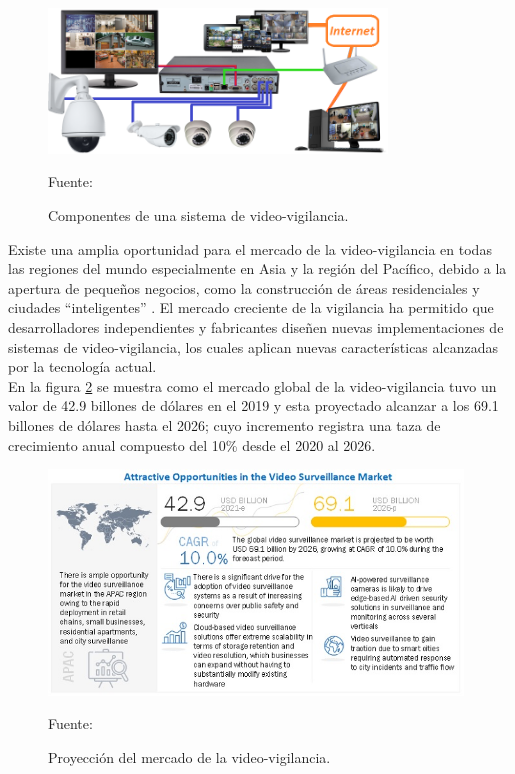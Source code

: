 \begin{figure}[H]
    \begin{center}
        \includegraphics[width=9cm]{img/capitulo_2/sis_videovigilancia.png}
        \caption{Componentes de una sistema de video-vigilancia.\\}
        Fuente: \cite{videosurvellance}
        \label{fig:sistema_video_vigilancia}
    \end{center}
    
\end{figure}

Existe una amplia oportunidad para el mercado de la video-vigilancia en todas las regiones del mundo especialmente en Asia y la región del Pacífico, debido a la apertura de pequeños negocios, como la construcción de áreas residenciales y ciudades ``inteligentes'' \cite{marketsandmarkets:market-surveillance}. El mercado creciente de la vigilancia ha permitido que desarrolladores independientes y fabricantes diseñen nuevas implementaciones de sistemas de video-vigilancia, los cuales aplican nuevas características alcanzadas por la tecnología actual.\\

En la figura \ref{fig:surveillance-market} se muestra como el mercado global de la video-vigilancia tuvo un valor de 42.9 billones de dólares en el 2019 y esta proyectado alcanzar a los 69.1 billones de dólares hasta el 2026; cuyo incremento registra una taza de crecimiento anual compuesto del 10\% desde el 2020 al 2026. \cite{marketsandmarkets:market-surveillance}\\

\begin{figure}[H]
    \begin{center}
        \includegraphics[width=11cm]{img/capitulo_2/surveillance-market.jpg}
        \caption{Proyección del mercado de la video-vigilancia.\\}
        Fuente: \cite{marketsandmarkets:market-surveillance}
        \label{fig:surveillance-market}
    \end{center}
\end{figure}

